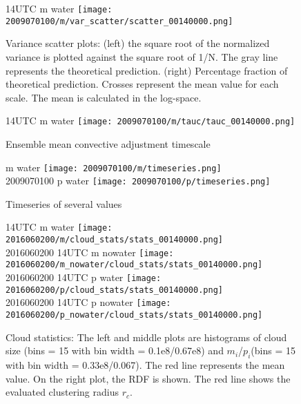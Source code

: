 \documentclass[a4paper, 12pt, draft]{article}
\begin{document}
\begin{figure}[ht] \label{fig:case1_var_scatter}
\noindent {} 14UTC m water
\texttt{[image: 2009070100/m/var\_scatter/scatter\_00140000.png]}\\
\caption{Variance scatter plots: (left) the square root of the normalized variance is plotted against the square root of 1/N. The gray line represents the theoretical prediction. (right) Percentage fraction of theoretical prediction. Crosses represent the mean value for each scale. The mean is calculated in the log-space.}
\end{figure}

\begin{figure}[ht] \label{fig:case1_tau_c}
\noindent {} 14UTC m water
\texttt{[image: 2009070100/m/tauc/tauc\_00140000.png]}\\
\caption{Ensemble mean convective adjustment timescale}
\end{figure}

\begin{figure}[ht] \label{fig:case1_timeseries}
\noindent {} m water
\texttt{[image: 2009070100/m/timeseries.png]}\\
2009070100 p water
\texttt{[image: 2009070100/p/timeseries.png]}\\
\caption{Timeseries of several values}
\end{figure}



\begin{figure}[ht] \label{fig:case1_stats}
\noindent {} 14UTC m water
\texttt{[image: 2016060200/m/cloud\_stats/stats\_00140000.png]}\\
2016060200 14UTC m nowater
\texttt{[image: 2016060200/m\_nowater/cloud\_stats/stats\_00140000.png]}\\
2016060200 14UTC p water
\texttt{[image: 2016060200/p/cloud\_stats/stats\_00140000.png]}\\
2016060200 14UTC p nowater
\texttt{[image: 2016060200/p\_nowater/cloud\_stats/stats\_00140000.png]}\\
\caption{Cloud statistics: The left and middle plots are histograms of cloud size (bins = 15 with bin width = 0.1e8/0.67e8) and $m_i$/$p_i$(bins = 15 with bin width = 0.33e8/0.067). The red line represents the mean value. On the right plot, the RDF is shown. The red line shows the evaluated clustering radius $r_c$.}
\end{figure}
\end{document}
